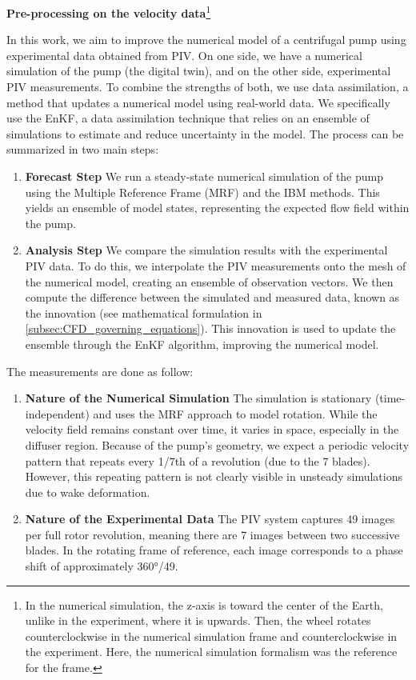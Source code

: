 \textbf{Pre-processing on the velocity data}\footnote{
In the numerical simulation, the z-axis is toward the center of the Earth, unlike in the experiment, where it is upwards.
Then, the wheel rotates counterclockwise in the numerical simulation frame and counterclockwise in the experiment.
Here, the numerical simulation formalism was the reference for the frame.
}

In this work, we aim to improve the numerical model of a centrifugal pump using experimental data obtained from PIV. On one side, we have a numerical simulation of the pump (the digital twin), and on the other side, experimental PIV measurements. To combine the strengths of both, we use data assimilation, a method that updates a numerical model using real-world data.
We specifically use the EnKF, a data assimilation technique that relies on an ensemble of simulations to estimate and reduce uncertainty in the model. The process can be summarized in two main steps:

\begin{enumerate}
    \item \textbf{Forecast Step} We run a steady-state numerical simulation of the pump using the Multiple Reference Frame (MRF) and the IBM methods. This yields an ensemble of model states, representing the expected flow field within the pump.
    \item \textbf{Analysis Step} We compare the simulation results with the experimental PIV data. To do this, we interpolate the PIV measurements onto the mesh of the numerical model, creating an ensemble of observation vectors. We then compute the difference between the simulated and measured data, known as the innovation (see mathematical formulation in \autoref{subsec:CFD_governing_equations}). This innovation is used to update the ensemble through the EnKF algorithm, improving the numerical model.
\end{enumerate}

\newpage

The measurements are done as follow:

\begin{enumerate}
    \item \textbf{Nature of the Numerical Simulation} The simulation is stationary (time-independent) and uses the MRF approach to model rotation. While the velocity field remains constant over time, it varies in space, especially in the diffuser region. Because of the pump's geometry, we expect a periodic velocity pattern that repeats every 1/7th of a revolution (due to the 7 blades). However, this repeating pattern is not clearly visible in unsteady simulations due to wake deformation.
    \item \textbf{Nature of the Experimental Data} The PIV system captures 49 images per full rotor revolution, meaning there are 7 images between two successive blades. In the rotating frame of reference, each image corresponds to a phase shift of approximately 360°/49.
\end{enumerate}



